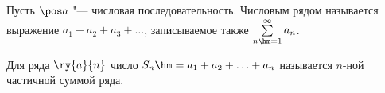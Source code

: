
Пусть $\pos a$ "--- числовая последовательность. Числовым рядом называется выражение
$a_1+a_2+a_3+\ldots$, записываемое также $\sum\limits_{n\hm=1}^\infty a_n$.

Для ряда $\ry{a}{n}$ число $S_n\hm=a_1+a_2+\ldots+a_n$ называется $n$-ной частичной суммой ряда.
